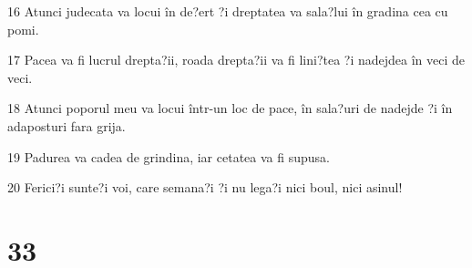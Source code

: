 \par 16 Atunci judecata va locui în de?ert ?i dreptatea va sala?lui în gradina cea cu pomi.
\par 17 Pacea va fi lucrul drepta?ii, roada drepta?ii va fi lini?tea ?i nadejdea în veci de veci.
\par 18 Atunci poporul meu va locui într-un loc de pace, în sala?uri de nadejde ?i în adaposturi fara grija.
\par 19 Padurea va cadea de grindina, iar cetatea va fi supusa.
\par 20 Ferici?i sunte?i voi, care semana?i ?i nu lega?i nici boul, nici asinul!

\chapter{33}

